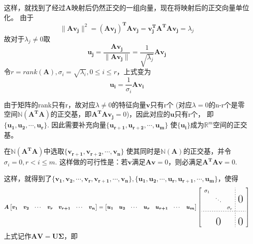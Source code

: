 \documentclass{article}
\begin{document}
\begin{CJK}{UTF8}{gbsn}
	这样，就找到了经过$\boldsymbol{A}$映射后仍然正交的一组向量，现在将映射后的正交向量单位化。
	由于$$\parallel\boldsymbol{Av_j}\parallel ^2=\boldsymbol{(Av_j)^TAv_j}=\boldsymbol{v^T_jA^TAv_j}=\lambda_j$$
	故对于$\lambda_j\neq0$取$$\boldsymbol{u_j}=\frac{\boldsymbol{Av_j}}{\parallel\boldsymbol{Av_j}\parallel}=\frac{1}{\sqrt{\lambda_j}}\boldsymbol{Av_j}$$
	令$r=rank(\boldsymbol{A}),\sigma_i=\sqrt{\lambda_i},0\le i\le r$，上式变为
	$$\boldsymbol{u_i}=\frac{1}{\sigma_i}\boldsymbol{Av_i}$$\par
	由于矩阵的rank只有r，故对应$\lambda\neq0$的特征向量$\boldsymbol{v}$只有r个
	(对应$\lambda=0$的n-r个是零空间$\mathbb{N}(\boldsymbol{A^TA})$的正交基，即$\boldsymbol{A^TAv_j}=0$)，因此对应的$\boldsymbol{u}$只有r个，
	即$\{\boldsymbol{u_1},\boldsymbol{u_2},\cdots,\boldsymbol{u_r}\}$.
	因此需要补充向量$\{\boldsymbol{u_{r+1}},\boldsymbol{u_{r+2}},\cdots,\boldsymbol{u_m}\}$
	使$\{\boldsymbol{u_i}\}$成为$\mathbb{R}^m$空间的正交基。\par
	在$\mathbb{N}(\boldsymbol{A^TA})$中选取$\{\boldsymbol{v_{r+1}},\boldsymbol{v_{r+2}},\cdots,\boldsymbol{v_n}\}$
	使其同时是$\mathbb{N}(\boldsymbol{A})$的正交基，并令$\sigma_i=0,r<i\leq m.$
	这样做的可行性是：若$\boldsymbol{v}$满足$\boldsymbol{Av}=0$，则必满足$\boldsymbol{A^TAv}=0$.\par
	这样，就得到了$\{\boldsymbol{v_1},\boldsymbol{v_2},\cdots,\boldsymbol{v_r},\boldsymbol{v_{r+1},\cdots,\boldsymbol{v_n}}\},\{\boldsymbol{u_1},\boldsymbol{u_2},\cdots,\boldsymbol{u_r},\boldsymbol{u_{r+1},\cdots,\boldsymbol{u_m}}\}$，使得
	$$
	\boldsymbol{A}\begin{bmatrix}\boldsymbol{v_1}&\boldsymbol{v_2}&\cdots&\boldsymbol{v_r}&\boldsymbol{v_{r+1}}&\cdots&\boldsymbol{v_n}\end{bmatrix}
	=\begin{bmatrix}\boldsymbol{u_1}&\boldsymbol{u_2}&\cdots&\boldsymbol{u_r}&\boldsymbol{u_{r+1}}&\cdots&\boldsymbol{u_m}\end{bmatrix}
	\left [\begin{array}{ccc;{2pt/2pt}ccc}
	\sigma_1& & &\\
	 &\ddots& &\text{\huge0}\\
	 & &\sigma_r&\\
	\hdashline[2pt/2pt]
	 & & & \\
	 &\text{\huge0}& &\text{\huge0}
	\end{array}\right ]
	$$
	上式记作$\boldsymbol{AV}=\boldsymbol{U\Sigma}$，即
	

\end{CJK}
\end{document}
